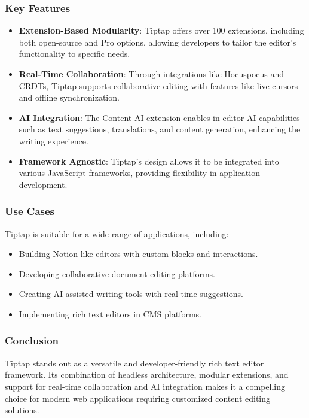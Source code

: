 \subsubsection{Key Features}
\begin{itemize}
    \item \textbf{Extension-Based Modularity}: Tiptap offers over 100 extensions, including both open-source and Pro options, allowing developers to tailor the editor’s functionality to specific needs.
    \item \textbf{Real-Time Collaboration}: Through integrations like Hocuspocus and CRDTs, Tiptap supports collaborative editing with features like live cursors and offline synchronization.
    \item \textbf{AI Integration}: The Content AI extension enables in-editor AI capabilities such as text suggestions, translations, and content generation, enhancing the writing experience.
    \item \textbf{Framework Agnostic}: Tiptap’s design allows it to be integrated into various JavaScript frameworks, providing flexibility in application development.
\end{itemize}

\subsubsection{Use Cases}
Tiptap is suitable for a wide range of applications, including:
\begin{itemize}
    \item Building Notion-like editors with custom blocks and interactions.
    \item Developing collaborative document editing platforms.
    \item Creating AI-assisted writing tools with real-time suggestions.
    \item Implementing rich text editors in CMS platforms. 
\end{itemize}    

\subsubsection{Conclusion}
Tiptap stands out as a versatile and developer-friendly rich text editor framework. Its combination of headless architecture, modular extensions, and support for real-time collaboration and AI integration makes it a compelling choice for modern web applications requiring customized content editing solutions.


